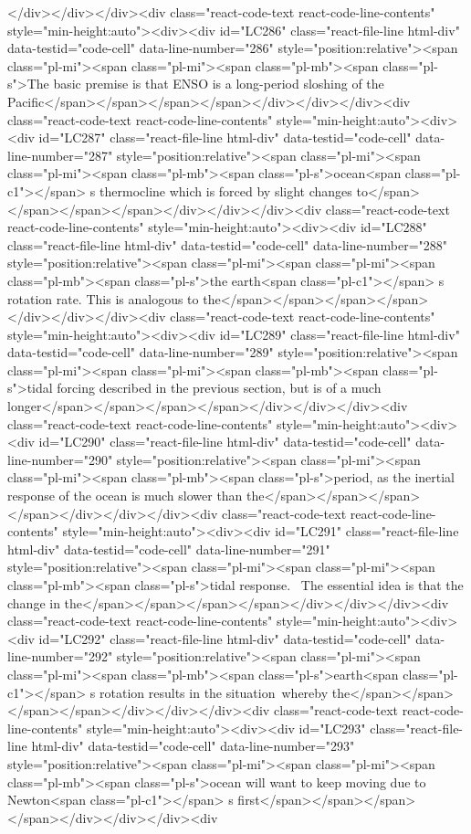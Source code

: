 {{{{</div></div></div><div class="react-code-text react-code-line-contents" style="min-height:auto"><div><div id="LC286" class="react-file-line html-div" data-testid="code-cell" data-line-number="286" style="position:relative"><span class="pl-mi"><span class="pl-mi"><span class="pl-mb"><span class="pl-s">The basic premise is that ENSO is a long-period sloshing of the Pacific</span></span></span></span></div></div></div><div class="react-code-text react-code-line-contents" style="min-height:auto"><div><div id="LC287" class="react-file-line html-div" data-testid="code-cell" data-line-number="287" style="position:relative"><span class="pl-mi"><span class="pl-mi"><span class="pl-mb"><span class="pl-s">ocean<span class="pl-c1">\textquotesingle</span> s thermocline which is forced by slight changes to</span></span></span></span></div></div></div><div class="react-code-text react-code-line-contents" style="min-height:auto"><div><div id="LC288" class="react-file-line html-div" data-testid="code-cell" data-line-number="288" style="position:relative"><span class="pl-mi"><span class="pl-mi"><span class="pl-mb"><span class="pl-s">the earth<span class="pl-c1">\textquotesingle</span> s rotation rate. This is analogous to the</span></span></span></span></div></div></div><div class="react-code-text react-code-line-contents" style="min-height:auto"><div><div id="LC289" class="react-file-line html-div" data-testid="code-cell" data-line-number="289" style="position:relative"><span class="pl-mi"><span class="pl-mi"><span class="pl-mb"><span class="pl-s">tidal forcing described in the previous section, but is of a much longer</span></span></span></span></div></div></div><div class="react-code-text react-code-line-contents" style="min-height:auto"><div><div id="LC290" class="react-file-line html-div" data-testid="code-cell" data-line-number="290" style="position:relative"><span class="pl-mi"><span class="pl-mi"><span class="pl-mb"><span class="pl-s">period, as the inertial response of the ocean is much slower than the</span></span></span></span></div></div></div><div class="react-code-text react-code-line-contents" style="min-height:auto"><div><div id="LC291" class="react-file-line html-div" data-testid="code-cell" data-line-number="291" style="position:relative"><span class="pl-mi"><span class="pl-mi"><span class="pl-mb"><span class="pl-s">tidal response. ~The essential idea is that the change in the</span></span></span></span></div></div></div><div class="react-code-text react-code-line-contents" style="min-height:auto"><div><div id="LC292" class="react-file-line html-div" data-testid="code-cell" data-line-number="292" style="position:relative"><span class="pl-mi"><span class="pl-mi"><span class="pl-mb"><span class="pl-s">earth<span class="pl-c1">\textquotesingle</span> s rotation results in the situation~whereby the</span></span></span></span></div></div></div><div class="react-code-text react-code-line-contents" style="min-height:auto"><div><div id="LC293" class="react-file-line html-div" data-testid="code-cell" data-line-number="293" style="position:relative"><span class="pl-mi"><span class="pl-mi"><span class="pl-mb"><span class="pl-s">ocean will want to keep moving due to Newton<span class="pl-c1">\textquotesingle</span> s first</span></span></span></span></div></div></div><div }}}}
